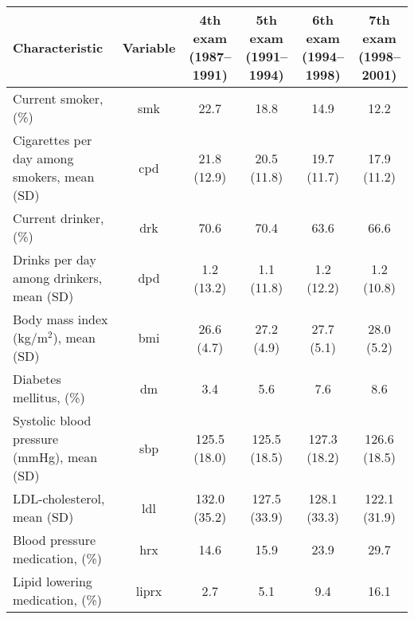 
\begin{tabular}{lccccc}
\toprule
Characteristic & Variable & \shortstack{4th exam \\ (1987–1991)} & \shortstack{5th exam \\ (1991–1994)} & \shortstack{6th exam \\ (1994–1998)} & \shortstack{7th exam \\ (1998–2001)}\\
\midrule
Current smoker, (\%) & smk & 22.7 & 18.8 & 14.9 & 12.2\\
Cigarettes per day among smokers, mean (SD) & cpd & 21.8 (12.9) & 20.5 (11.8) & 19.7 (11.7) & 17.9 (11.2)\\
Current drinker, (\%) & drk & 70.6 & 70.4 & 63.6 & 66.6\\
Drinks per day among drinkers, mean (SD) & dpd & 1.2 (13.2) & 1.1 (11.8) & 1.2 (12.2) & 1.2 (10.8)\\
Body mass index (kg/m$^2$), mean (SD) & bmi & 26.6 (4.7) & 27.2 (4.9) & 27.7 (5.1) & 28.0 (5.2)\\
Diabetes mellitus, (\%) & dm & 3.4 & 5.6 & 7.6 & 8.6\\
Systolic blood pressure (mmHg), mean (SD) & sbp & 125.5 (18.0) & 125.5 (18.5) & 127.3 (18.2) & 126.6 (18.5)\\
LDL-cholesterol, mean (SD) & ldl & 132.0 (35.2) & 127.5 (33.9) & 128.1 (33.3) & 122.1 (31.9)\\
Blood pressure medication, (\%) & hrx & 14.6 & 15.9 & 23.9 & 29.7\\
Lipid lowering medication, (\%) & liprx & 2.7 & 5.1 & 9.4 & 16.1\\
\bottomrule
\end{tabular}
